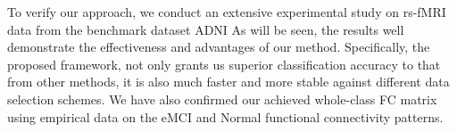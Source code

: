 \documentclass[journal]{IEEEtran}
\begin{document}
	
	To verify our approach, we conduct an extensive experimental study on rs-fMRI data from the
	benchmark dataset ADNI
	As will be seen, the results well demonstrate the effectiveness and advantages of our method. Specifically, the proposed framework, not only grants us superior classification accuracy to that from other methods, it is also much faster and more stable against different data selection schemes. We have also confirmed our achieved whole-class FC matrix using empirical data on the eMCI and Normal functional connectivity patterns.
	
\end{document}
